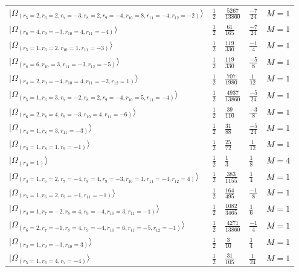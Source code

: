 \documentclass[11pt,twoside,openright]{book}
\begin{document}
\begin{longtable}{p{4cm}llll}
$|\Omega_{(r_{5}=2, r_{6}=2, r_{7}=-3, r_{8}=2, r_{9}=-4, r_{10}=8, r_{11}=-4, r_{12}=-2)}\rangle$ & $\frac{1}{2}$ & $\frac{5267}{13860}$ & $\frac{-7}{24}$ & $M=1$ \\
$|\Omega_{(r_{6}=4, r_{9}=-3, r_{10}=4, r_{11}=-4)}\rangle$ & $\frac{1}{2}$ & $\frac{61}{165}$ & $\frac{-7}{24}$ & $M=1$ \\
$|\Omega_{(r_{5}=1, r_{6}=2, r_{10}=1, r_{11}=-3)}\rangle$ & $\frac{1}{2}$ & $\frac{119}{330}$ & $\frac{-1}{4}$ & $M=1$ \\
$|\Omega_{(r_{8}=6, r_{10}=3, r_{11}=-3, r_{12}=-5)}\rangle$ & $\frac{1}{2}$ & $\frac{119}{330}$ & $\frac{-5}{8}$ & $M=1$ \\
$|\Omega_{(r_{4}=2, r_{9}=-4, r_{10}=4, r_{11}=-2, r_{12}=1)}\rangle$ & $\frac{1}{2}$ & $\frac{707}{1980}$ & $\frac{1}{12}$ & $M=1$ \\
$|\Omega_{(r_{5}=1, r_{6}=3, r_{7}=-2, r_{8}=2, r_{9}=-4, r_{10}=5, r_{11}=-4)}\rangle$ & $\frac{1}{2}$ & $\frac{4937}{13860}$ & $\frac{-5}{24}$ & $M=1$ \\
$|\Omega_{(r_{6}=2, r_{8}=4, r_{9}=-3, r_{10}=4, r_{11}=-6)}\rangle$ & $\frac{1}{2}$ & $\frac{39}{110}$ & $\frac{-3}{8}$ & $M=1$ \\
$|\Omega_{(r_{4}=1, r_{8}=3, r_{11}=-3)}\rangle$ & $\frac{1}{2}$ & $\frac{31}{88}$ & $\frac{-5}{24}$ & $M=1$ \\
$|\Omega_{(r_{3}=1, r_{8}=1, r_{9}=-1)}\rangle$ & $\frac{1}{2}$ & $\frac{25}{72}$ & $\frac{1}{12}$ & $M=1$ \\
$|\Omega_{(r_{3}=1)}\rangle$ & $\frac{1}{2}$ & $\frac{1}{3}$ & $\frac{1}{8}$ & $M=4$ \\
$|\Omega_{(r_{3}=1, r_{6}=2, r_{7}=-4, r_{8}=4, r_{9}=-3, r_{10}=1, r_{11}=-4, r_{12}=4)}\rangle$ & $\frac{1}{2}$ & $\frac{383}{1155}$ & $\frac{1}{4}$ & $M=1$ \\
$|\Omega_{(r_{5}=1, r_{6}=2, r_{9}=-1, r_{11}=-1)}\rangle$ & $\frac{1}{2}$ & $\frac{164}{495}$ & $\frac{-1}{8}$ & $M=1$ \\
$|\Omega_{(r_{3}=1, r_{7}=-2, r_{8}=4, r_{9}=-4, r_{10}=3, r_{11}=-1)}\rangle$ & $\frac{1}{2}$ & $\frac{1082}{3465}$ & $\frac{1}{6}$ & $M=1$ \\
$|\Omega_{(r_{6}=2, r_{7}=-1, r_{8}=4, r_{9}=-4, r_{10}=6, r_{11}=-5, r_{12}=-1)}\rangle$ & $\frac{1}{2}$ & $\frac{4271}{13860}$ & $\frac{-1}{4}$ & $M=1$ \\
$|\Omega_{(r_{3}=1, r_{9}=-3, r_{10}=3)}\rangle$ & $\frac{1}{2}$ & $\frac{3}{10}$ & $\frac{1}{4}$ & $M=1$ \\
$|\Omega_{(r_{5}=1, r_{6}=4, r_{7}=-4)}\rangle$ & $\frac{1}{2}$ & $\frac{31}{105}$ & $\frac{1}{24}$ & $M=1$ \\

\end{longtable}
\end{document}
